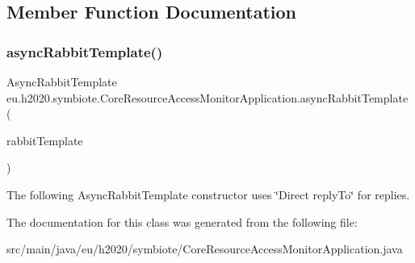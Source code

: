 \subsection{Member Function Documentation}
\mbox{\label{classeu_1_1h2020_1_1symbiote_1_1CoreResourceAccessMonitorApplication_a5ddd9256ae88e6362a7e76b640d24f50}} 
\subsubsection{\texorpdfstring{async\+Rabbit\+Template()}{asyncRabbitTemplate()}}
{\footnotesize\ttfamily Async\+Rabbit\+Template eu.\+h2020.\+symbiote.\+Core\+Resource\+Access\+Monitor\+Application.\+async\+Rabbit\+Template (\begin{DoxyParamCaption}\item[{Rabbit\+Template}]{rabbit\+Template }\end{DoxyParamCaption})}

The following Async\+Rabbit\+Template constructor uses \char`\"{}\+Direct reply\+To\char`\"{} for replies.

The documentation for this class was generated from the following file\+:\begin{DoxyCompactItemize}
\item 
src/main/java/eu/h2020/symbiote/Core\+Resource\+Access\+Monitor\+Application.\+java\end{DoxyCompactItemize}
